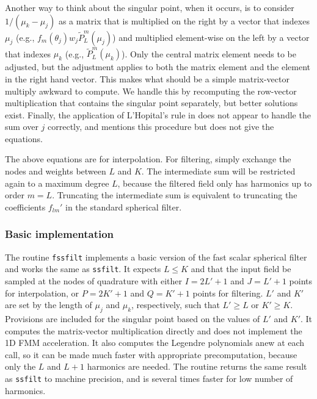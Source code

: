 Another way to think about the singular point, when it occurs, is to consider $1/(\mu_k - \mu_j)$ as a matrix that is multiplied on the right by a vector that indexes $\mu_j$ (e.g., $f_m(\theta_j) w_j\widetilde P_L^m(\mu_j)$) and multiplied element-wise on the left by a vector that indexes $\mu_k$ (e.g., $\widetilde P_L^m(\mu_k)$).  Only the central matrix element needs to be adjusted, but the adjustment applies to both the matrix element and the element in the right hand vector. This makes what should be a simple matrix-vector multiply awkward to compute. We handle this by recomputing the row-vector multiplication that contains the singular point separately, but better solutions exist.  Finally, the application of L'Hopital's rule in \cite{yucel2008helmholtz} does not appear to handle the sum over $j$ correctly, and \cite{jakob1997fast} mentions this procedure but does not give the equations.

The above equations are for interpolation. For filtering, simply exchange the nodes and weights between $L$ and $K$. The intermediate sum will be restricted again to a maximum degree $L$, because the filtered field only has harmonics up to order $m = L$. Truncating the intermediate sum is equivalent to truncating the coefficients $f_{lm}'$ in the standard spherical filter.   

\subsubsection{Basic implementation}

The routine \texttt{fssfilt} implements a basic version of the fast scalar spherical filter and works the same as \texttt{ssfilt}. It expects $L \le K$ and that the input field be sampled at the nodes of quadrature with either $I = 2L' + 1$ and $J = L' +1$ points for interpolation, or $P = 2K' +1$ and $Q = K' + 1$ points for filtering. $L'$ and $K'$ are set by the length of $\mu_j$ and $\mu_k$, respectively, such that $L' \ge L$ or $K' \ge K$.  Provisions are included for the singular point based on the values of $L'$ and $K'$. It computes the matrix-vector multiplication directly and does not implement the 1D FMM acceleration. It also computes the Legendre polynomials anew at each call, so it can be made much faster with appropriate precomputation, because only the $L$ and $L+1$ harmonics are needed. The routine returns the same result as \texttt{ssfilt} to machine precision, and is several times faster for low number of harmonics.

{\footnotesize
{}
}

